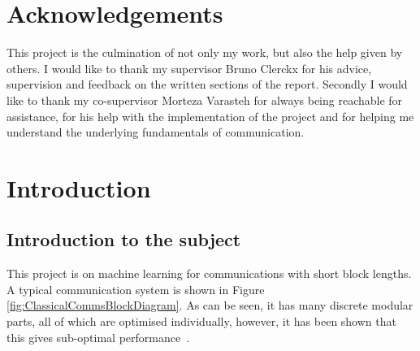 \documentclass[12pt,onecolumn,letterpaper]{article}
\begin{document}
\section*{Acknowledgements}
This project is the culmination of not only my work, but also the help given by others. I would like to thank my supervisor Bruno Clerckx for his advice, supervision and feedback on the written sections of the report. Secondly I would like to thank 
my co-supervisor Morteza Varasteh for always being reachable for assistance, for his help with the implementation of the project and for helping me understand the underlying fundamentals of communication.

\pagebreak


\tableofcontents
\pagebreak

\FloatBarrier
\section{Introduction}

\subsection{Introduction to the subject}

This project is on machine learning for communications with short block lengths. A typical communication system is shown in Figure \ref{fig:ClassicalCommsBlockDiagram}. As can be seen, it has many discrete modular parts, all of which are optimised individually, however, it has been shown that this gives sub-optimal performance~\cite{ChannelEncodingOptimality}.
\end{document}
